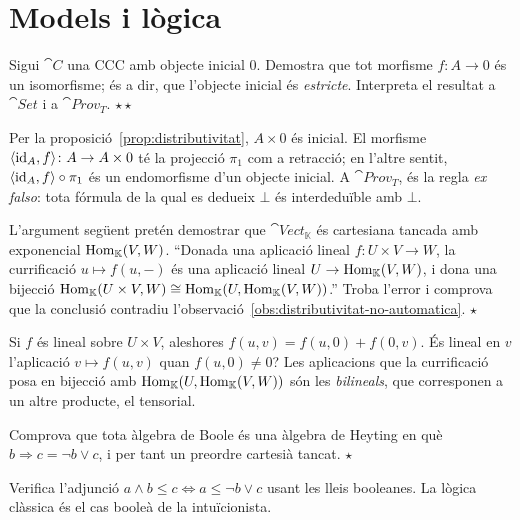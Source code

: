 \section{Models i lògica}

\begin{exercici}
Sigui $\cat{C}$ una CCC amb objecte inicial $0$. Demostra que tot morfisme $f\colon A\to 0$ és un isomorfisme; és a dir, que l'objecte inicial és \emph{estricte}. Interpreta el resultat a $\cat{Set}$ i a $\cat{Prov}_T$. \hfill{\normalfont$\star\star$}
\begin{indicacio}
Per la proposició~\ref{prop:distributivitat}, $A\times 0$ és inicial. El morfisme $\langle\operatorname{id}_A,f\rangle\colon A\to A\times 0$ té la projecció $\pi_1$ com a retracció; en l'altre sentit, $\langle\operatorname{id}_A,f\rangle\circ\pi_1$ és un endomorfisme d'un objecte inicial. A $\cat{Prov}_T$, és la regla \emph{ex falso}: tota fórmula de la qual es dedueix $\bot$ és interdeduïble amb $\bot$.
\end{indicacio}
\end{exercici}

\begin{exercici}
L'argument següent pretén demostrar que $\cat{Vect}_{\mathbb K}$ és cartesiana tancada amb exponencial $\operatorname{Hom}_{\mathbb K}(V,W)$. \enquote{Donada una aplicació lineal $f\colon U\times V\to W$, la currificació $u\mapsto f(u,-)$ és una aplicació lineal $U\to\operatorname{Hom}_{\mathbb K}(V,W)$, i dona una bijecció $\operatorname{Hom}_{\mathbb K}(U\times V,W)\cong\operatorname{Hom}_{\mathbb K}(U,\operatorname{Hom}_{\mathbb K}(V,W))$.} Troba l'error i comprova que la conclusió contradiu l'observació~\ref{obs:distributivitat-no-automatica}. \hfill{\normalfont$\star$}
\begin{indicacio}
Si $f$ és lineal sobre $U\times V$, aleshores $f(u,v)=f(u,0)+f(0,v)$. És lineal en $v$ l'aplicació $v\mapsto f(u,v)$ quan $f(u,0)\neq 0$? Les aplicacions que la currificació posa en bijecció amb $\operatorname{Hom}_{\mathbb K}(U,\operatorname{Hom}_{\mathbb K}(V,W))$ són les \emph{bilineals}, que corresponen a un altre producte, el tensorial.
\end{indicacio}
\end{exercici}

\begin{exercici}
Comprova que tota àlgebra de Boole és una àlgebra de Heyting en què $b\Rightarrow c=\neg b\vee c$, i per tant un preordre cartesià tancat. \hfill{\normalfont$\star$}
\begin{indicacio}
Verifica l'adjunció $a\wedge b\leq c\Leftrightarrow a\leq\neg b\vee c$ usant les lleis booleanes. La lògica clàssica és el cas booleà de la intuïcionista.
\end{indicacio}
\end{exercici}

